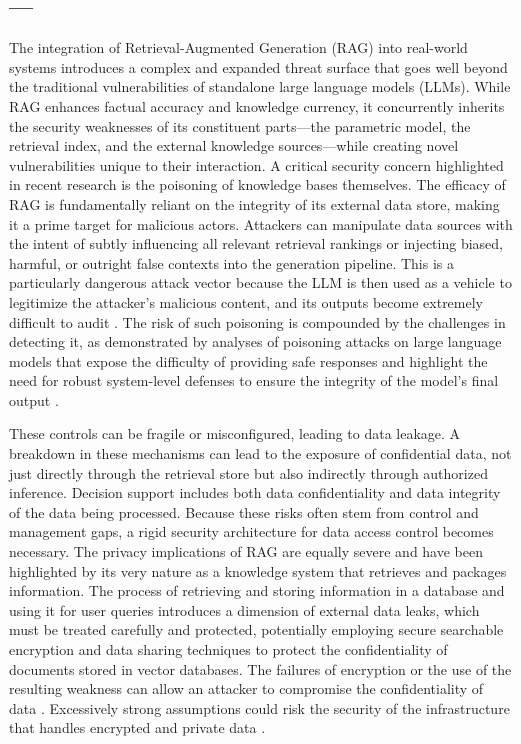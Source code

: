 \documentclass[11pt]{article}
\begin{document}
\subsection{---}

The integration of Retrieval-Augmented Generation (RAG) into real-world systems introduces a complex and expanded threat surface that goes well beyond the traditional vulnerabilities of standalone large language models (LLMs). While RAG enhances factual accuracy and knowledge currency, it concurrently inherits the security weaknesses of its constituent parts---the parametric model, the retrieval index, and the external knowledge sources---while creating novel vulnerabilities unique to their interaction. A critical security concern highlighted in recent research is the poisoning of knowledge bases themselves. The efficacy of RAG is fundamentally reliant on the integrity of its external data store, making it a prime target for malicious actors. Attackers can manipulate data sources with the intent of subtly influencing all relevant retrieval rankings or injecting biased, harmful, or outright false contexts into the generation pipeline. This is a particularly dangerous attack vector because the LLM is then used as a vehicle to legitimize the attacker's malicious content, and its outputs become extremely difficult to audit \cite{ref441}. The risk of such poisoning is compounded by the challenges in detecting it, as demonstrated by analyses of poisoning attacks on large language models that expose the difficulty of providing safe responses and highlight the need for robust system-level defenses to ensure the integrity of the model's final output \cite{ref442}.

These controls can be fragile or misconfigured, leading to data leakage. A breakdown in these mechanisms can lead to the exposure of confidential data, not just directly through the retrieval store but also indirectly through authorized inference. Decision support includes both data confidentiality and data integrity of the data being processed. Because these risks often stem from control and management gaps, a rigid security architecture for data access control becomes necessary. The privacy implications of RAG are equally severe and have been highlighted by its very nature as a knowledge system that retrieves and packages information. The process of retrieving and storing information in a database and using it for user queries introduces a dimension of external data leaks, which must be treated carefully and protected, potentially employing secure searchable encryption and data sharing techniques to protect the confidentiality of documents stored in vector databases. The failures of encryption or the use of the resulting weakness can allow an attacker to compromise the confidentiality of data \cite{ref443,ref444}. Excessively strong assumptions could risk the security of the infrastructure that handles encrypted and private data \cite{ref445,ref446}.
\end{document}
